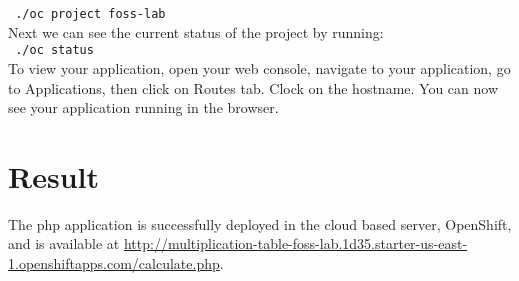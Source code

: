 \documentclass[12pt,a4paper]{article}
\begin{document}
\newline
\texttt{\ ./oc project foss-lab}\\
\newline
Next we can see the current status of the project by running:\\
\newline
\texttt{\ ./oc status}\\
\newline
To view your application, open your web console, navigate to your application, go to Applications, then click on Routes tab. Clock on the hostname. You can now see your application running in the browser.\\
\newline

\section{Result}

The php application is successfully deployed in the cloud based server, OpenShift, and is available at \url{http://multiplication-table-foss-lab.1d35.starter-us-east-1.openshiftapps.com/calculate.php}.
\end{document}
